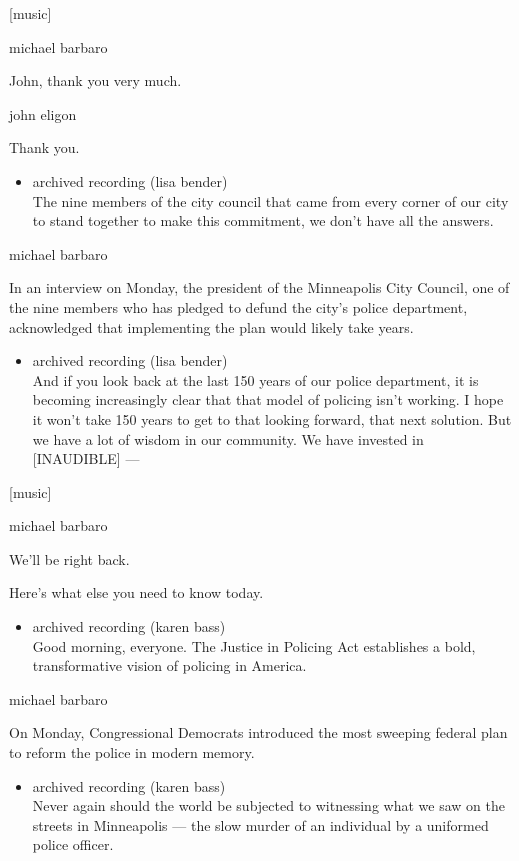 {[}music{]}

michael barbaro

John, thank you very much.

john eligon

Thank you.

\begin{itemize}
\tightlist
\item
  archived recording (lisa bender)\\
  The nine members of the city council that came from every corner of
  our city to stand together to make this commitment, we don't have all
  the answers.
\end{itemize}

michael barbaro

In an interview on Monday, the president of the Minneapolis City
Council, one of the nine members who has pledged to defund the city's
police department, acknowledged that implementing the plan would likely
take years.

\begin{itemize}
\tightlist
\item
  archived recording (lisa bender)\\
  And if you look back at the last 150 years of our police department,
  it is becoming increasingly clear that that model of policing isn't
  working. I hope it won't take 150 years to get to that looking
  forward, that next solution. But we have a lot of wisdom in our
  community. We have invested in {[}INAUDIBLE{]} ---
\end{itemize}

{[}music{]}

michael barbaro

We'll be right back.

Here's what else you need to know today.

\begin{itemize}
\tightlist
\item
  archived recording (karen bass)\\
  Good morning, everyone. The Justice in Policing Act establishes a
  bold, transformative vision of policing in America.
\end{itemize}

michael barbaro

On Monday, Congressional Democrats introduced the most sweeping federal
plan to reform the police in modern memory.

\begin{itemize}
\tightlist
\item
  archived recording (karen bass)\\
  Never again should the world be subjected to witnessing what we saw on
  the streets in Minneapolis --- the slow murder of an individual by a
  uniformed police officer.
\end{itemize}

